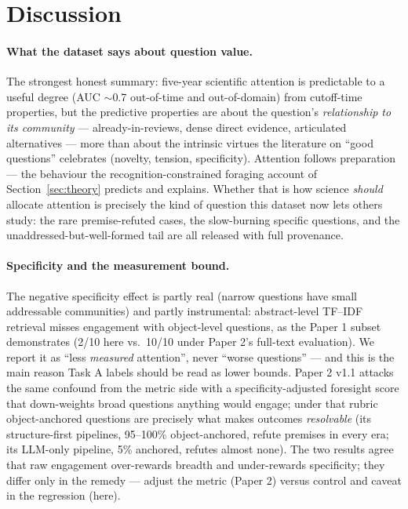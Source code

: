 \documentclass[11pt]{article}
\begin{document}
\section{Discussion}
\label{sec:discussion}

\paragraph{What the dataset says about question value.} The strongest
honest summary: five-year scientific attention is predictable to a
useful degree (AUC $\sim$0.7 out-of-time and out-of-domain) from
cutoff-time properties, but the predictive properties are about the
question's \emph{relationship to its community} --- already-in-reviews,
dense direct evidence, articulated alternatives --- more than about the
intrinsic virtues the literature on ``good questions'' celebrates
(novelty, tension, specificity). Attention follows preparation ---
the behaviour the recognition-constrained foraging account of
Section~\ref{sec:theory} predicts and explains. Whether
that is how science \emph{should} allocate attention is precisely the
kind of question this dataset now lets others study: the rare
premise-refuted cases, the slow-burning specific questions, and the
unaddressed-but-well-formed tail are all released with full provenance.

\paragraph{Specificity and the measurement bound.} The negative
specificity effect is partly real (narrow questions have small
addressable communities) and partly instrumental: abstract-level TF--IDF
retrieval misses engagement with object-level questions, as the Paper 1
subset demonstrates (2/10 here vs.\ 10/10 under Paper 2's full-text
evaluation). We report it as ``less \emph{measured} attention'', never
``worse questions'' --- and this is the main reason Task A labels should
be read as lower bounds. Paper 2 v1.1 attacks the same confound from
the metric side with a specificity-adjusted foresight score that
down-weights broad questions anything would engage; under that rubric
object-anchored questions are precisely what makes outcomes
\emph{resolvable} (its structure-first pipelines, 95--100\%
object-anchored, refute premises in every era; its LLM-only pipeline,
5\% anchored, refutes almost none). The two results agree that raw
engagement over-rewards breadth and under-rewards specificity; they
differ only in the remedy --- adjust the metric (Paper 2) versus
control and caveat in the regression (here).
\end{document}
